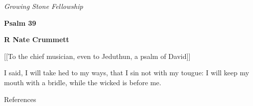 \documentclass[dark]{gsf-presentation}
\begin{document}
\begin{frame}[plain]
	\begin{center}
		\textit{\Large Growing Stone Fellowship}

		\vspace{3mm}
		\textbf{\huge Psalm 39}

		\vspace{5mm}
		\textcolor{SecondColor}{\bf \Large R Nate Crummett}
	\end{center}
\end{frame}

\setcounter{framenumber}{0}

\begin{frame}
	\LARGE
	\begin{english}
		\begin{center}
			\textcolor{SecondColor}{
				\Large
				[[To the chief musician, even to Jeduthun, a 
				psalm of David]]
			}

			I said, I will take hed to my ways, that I sin
			not with my tougue: I will keep my mouth with
			a bridle, while the wicked is before me.
		\end{center}
	\end{english}

	\begin{hebrew}
		\begin{center}
		\end{center}
	\end{hebrew}
\end{frame}

\begin{frame}{References}
	\printbibliography
\end{frame}
\end{document}
